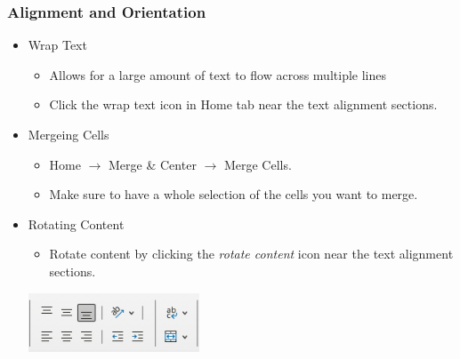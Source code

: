 \documentclass[12pt]{beamer}
\begin{document}
	\begin{frame}
		\frametitle{Alignment and Orientation}
	\begin{itemize}
		\item Wrap Text
			\begin{itemize}
				\item Allows for a large amount of text to flow across multiple lines
				\item Click the wrap text icon in Home tab near the text alignment sections.
			\end{itemize}
		\item Mergeing Cells
			\begin{itemize}
				\item Home $\rightarrow$ Merge \& Center $\rightarrow$ Merge Cells.
				\item Make sure to have a whole selection of the cells you want to merge.
			\end{itemize}
		\item Rotating Content
			\begin{itemize}
				\item Rotate content by clicking the \textit{rotate content} icon near the text alignment sections.
			\end{itemize}
		\begin{center}
			\includegraphics[width=0.4\textwidth]{wraprotatetext.png}
		\end{center}
	\end{itemize}
	\end{frame}
\end{document}
